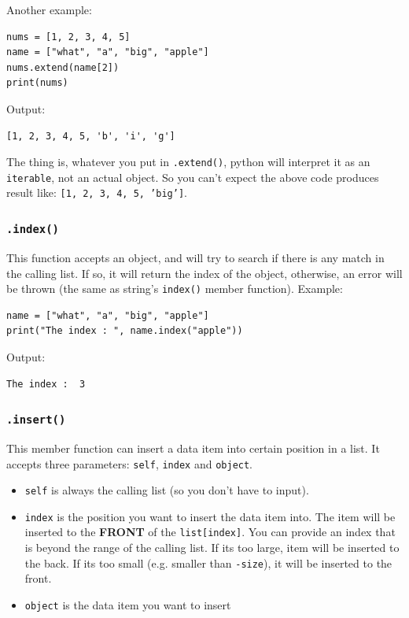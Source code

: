 \documentclass[12pt]{book}
\begin{document}
Another example:
\begin{verbatim}
nums = [1, 2, 3, 4, 5]
name = ["what", "a", "big", "apple"]
nums.extend(name[2])
print(nums)
\end{verbatim}
Output:
\begin{verbatim}
[1, 2, 3, 4, 5, 'b', 'i', 'g']
\end{verbatim}
The thing is, whatever you put in \texttt{.extend()}, python will interpret it as an \texttt{iterable}, not an actual object. So you can't expect the above code produces result like: \texttt{[1, 2, 3, 4, 5, 'big']}.
\subsubsection{\texttt{.index()}}
\label{sec:orgdc884d9}
This function accepts an object, and will try to search if there is any match in the calling list. If so, it will return the index of the object, otherwise, an error will be thrown (the same as string's \texttt{index()} member function). Example:
\begin{verbatim}
name = ["what", "a", "big", "apple"]
print("The index : ", name.index("apple"))
\end{verbatim}
Output:
\begin{verbatim}
The index :  3
\end{verbatim}
\subsubsection{\texttt{.insert()}}
\label{sec:orgd6eac56}
This member function can insert a data item into certain position in a list. It accepts three parameters: \texttt{self}, \texttt{index} and \texttt{object}.
\begin{itemize}
\item \texttt{self} is always the calling list (so you don't have to input).
\item \texttt{index} is the position you want to insert the data item into. The item will be inserted to the \textbf{FRONT} of the \texttt{list[index]}. You can provide an index that is beyond the range of the calling list. If its too large, item will be inserted to the back. If its too small (e.g. smaller than \texttt{-size}), it will be inserted to the front.
\item \texttt{object} is the data item you want to insert
\end{itemize}
\end{document}
